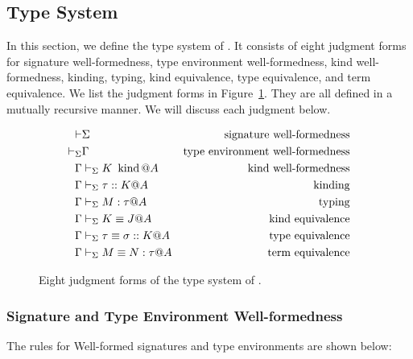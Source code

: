 \subsection{Type System}

In this section, we define the type system of \LMD.  It consists of eight
judgment forms for signature well-formedness, type environment well-formedness,
kind well-formedness, kinding, typing, kind equivalence, type equivalence, and
term equivalence.  We list the judgment forms in
Figure~\ref{fig:LMD-six-judgments}. They are all defined in a mutually
recursive manner. We will discuss each judgment below.

\begin{figure}[tbp]
    \begin{center}
    \begin{align*}
      \vdash & \Sigma                     & \text{signature well-formedness}        \\
      \vdash_\Sigma     & \Gamma                         & \text{type environment well-formedness} \\
      \Gamma     & \vdash_\Sigma K \operatorname{\ kind} @ A           & \text{kind well-formedness}             \\
      \Gamma     & \vdash_\Sigma \tau :: K @ A           & \text{kinding}                          \\
      \Gamma     & \vdash_\Sigma M : \tau @ A            & \text{typing}                           \\
      \Gamma     & \vdash_\Sigma K \equiv J @ A              & \text{kind equivalence}                 \\
      \Gamma     & \vdash_\Sigma \tau \equiv \sigma :: K @ A & \text{type equivalence}                 \\
      \Gamma     & \vdash_\Sigma M \equiv N : \tau @ A       & \text{term equivalence}
    \end{align*}
    \caption{Eight judgment forms of the type system of \LMD.}
    \label{fig:LMD-six-judgments}
  \end{center}
\end{figure}

\subsubsection{Signature and Type Environment Well-formedness}
The rules for Well-formed signatures and type environments are
shown below:
%
{
\begin{center}
  \infrule{
  }{
    \vdash \emptyset
  }
  \hfil
  \hfil
  \\[2mm]
  \infrule{
  }{
    \V \emptyset
  }
  \hfil
\end{center}
}

